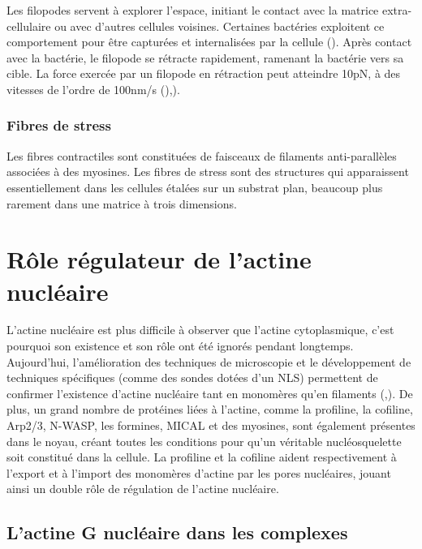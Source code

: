 Les filopodes servent à explorer l'espace, initiant le contact avec la matrice extra-cellulaire ou avec d'autres cellules voisines. 
Certaines bactéries exploitent ce comportement pour être capturées et internalisées par la cellule (\cite{romero_atp-mediated_2011}). 
Après contact avec la bactérie, le filopode se rétracte rapidement, ramenant la bactérie vers sa cible.
La force exercée par un filopode en rétraction peut atteindre 10pN, à des vitesses de l'ordre de 100nm/s (\cite{vonna_micromechanics_2007}),\cite{romero_atp-mediated_2011}). 



\subsubsection{Fibres de stress}

Les fibres contractiles sont constituées de faisceaux de filaments anti-parallèles associées à des myosines. 
Les fibres de stress sont des structures qui apparaissent essentiellement dans les cellules étalées sur un substrat plan, beaucoup plus rarement dans une matrice à trois dimensions. 

\section{Rôle régulateur de l'actine nucléaire}

L'actine nucléaire est plus difficile à observer que l'actine cytoplasmique, c'est pourquoi son existence et son rôle ont été ignorés pendant longtemps. 
Aujourd'hui, l'amélioration des techniques de microscopie et le développement de techniques spécifiques (comme des sondes dotées d'un NLS) permettent de confirmer l'existence d'actine nucléaire tant en monomères qu'en filaments (\cite{mcdonald_nucleoplasmic_2006},\cite{baarlink_nuclear_2013}). 
De plus, un grand nombre de protéines liées à l'actine, comme la profiline, la cofiline, Arp2/3, N-WASP, les formines, MICAL et des myosines, sont également présentes dans le noyau, créant toutes les conditions pour qu'un véritable nucléosquelette soit constitué dans la cellule. 
La profiline et la cofiline aident respectivement à l'export et à l'import des monomères d'actine par les pores nucléaires, jouant ainsi un double rôle de régulation de l'actine nucléaire. 


\subsection{L'actine G nucléaire dans les complexes}

